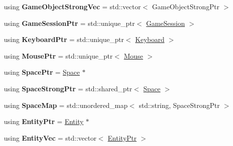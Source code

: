 \begin{DoxyCompactItemize}
\item 
\hypertarget{namespaceDCEngine_a3a151a58507d3068a1a826c3d3d70c9d}{using {\bfseries Game\-Object\-Strong\-Vec} = std\-::vector$<$ Game\-Object\-Strong\-Ptr $>$}\label{namespaceDCEngine_a3a151a58507d3068a1a826c3d3d70c9d}

\item 
\hypertarget{namespaceDCEngine_a1e0f9c97553be5cc609af82c337294e7}{using {\bfseries Game\-Session\-Ptr} = std\-::unique\-\_\-ptr$<$ \hyperlink{classDCEngine_1_1GameSession}{Game\-Session} $>$}\label{namespaceDCEngine_a1e0f9c97553be5cc609af82c337294e7}

\item 
\hypertarget{namespaceDCEngine_a3a9d382fdb5de71c8861c518f5d01262}{using {\bfseries Keyboard\-Ptr} = std\-::unique\-\_\-ptr$<$ \hyperlink{classDCEngine_1_1Keyboard}{Keyboard} $>$}\label{namespaceDCEngine_a3a9d382fdb5de71c8861c518f5d01262}

\item 
\hypertarget{namespaceDCEngine_a7f30f74918faec82305eb37e1e5788ea}{using {\bfseries Mouse\-Ptr} = std\-::unique\-\_\-ptr$<$ \hyperlink{classDCEngine_1_1Mouse}{Mouse} $>$}\label{namespaceDCEngine_a7f30f74918faec82305eb37e1e5788ea}

\item 
\hypertarget{namespaceDCEngine_acb43045fbe3e8b58659b15567ee6ea81}{using {\bfseries Space\-Ptr} = \hyperlink{classDCEngine_1_1Space}{Space} $\ast$}\label{namespaceDCEngine_acb43045fbe3e8b58659b15567ee6ea81}

\item 
\hypertarget{namespaceDCEngine_a82728633ab6c1f05aaa73360fa6966b4}{using {\bfseries Space\-Strong\-Ptr} = std\-::shared\-\_\-ptr$<$ \hyperlink{classDCEngine_1_1Space}{Space} $>$}\label{namespaceDCEngine_a82728633ab6c1f05aaa73360fa6966b4}

\item 
\hypertarget{namespaceDCEngine_a4e791d1e5562a071a54b4d0f4b139d1e}{using {\bfseries Space\-Map} = std\-::unordered\-\_\-map$<$ std\-::string, Space\-Strong\-Ptr $>$}\label{namespaceDCEngine_a4e791d1e5562a071a54b4d0f4b139d1e}

\item 
\hypertarget{namespaceDCEngine_a168258d320ced60e290e9c3fb5d5bbba}{using {\bfseries Entity\-Ptr} = \hyperlink{classDCEngine_1_1Entity}{Entity} $\ast$}\label{namespaceDCEngine_a168258d320ced60e290e9c3fb5d5bbba}

\item 
\hypertarget{namespaceDCEngine_a2c7646cec3086843b0dd5d63dbd70cac}{using {\bfseries Entity\-Vec} = std\-::vector$<$ \hyperlink{classDCEngine_1_1Entity}{Entity\-Ptr} $>$}\label{namespaceDCEngine_a2c7646cec3086843b0dd5d63dbd70cac}


\end{DoxyCompactItemize}
